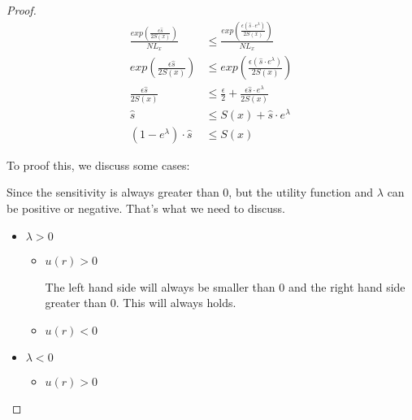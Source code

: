 \begin{proof}

\begin{equation*}
\begin{split}
\frac{exp(\frac{\epsilon \hat{s}}{2 S(x)})}{NL_x}
& \leq \frac{exp(\frac{\epsilon (\hat{s} \cdot e^{\lambda})}{2 S(x)})}{NL_x}\\
exp(\frac{\epsilon \hat{s}}{2 S(x)})
& \leq exp(\frac{\epsilon (\hat{s} \cdot e^{\lambda})}{2 S(x)}) \\
\frac{\epsilon \hat{s}}{2 S(x)}
& \leq \frac{\epsilon}{2} + \frac{\epsilon \hat{s} \cdot  e^{\lambda}}{2 S(x)}\\
\hat{s} & \leq S(x) + \hat{s} \cdot e^{\lambda}\\
(1 - e^{\lambda}) \cdot \hat{s} & \leq S(x)
\end{split}
\end{equation*}

To proof this, we discuss some cases:

Since the sensitivity is always greater than 0, but the utility function and $\lambda$ can be positive or negative. That's what we need to discuss.

\begin{itemize}
	\item $\lambda > 0$
	\begin{itemize}
		\item $u(r) > 0$

		The left hand side will always be smaller than 0 and the right hand side greater than 0. This will always holds.

		\item $u(r) < 0$


	\end{itemize}
	\item $\lambda < 0$
	\begin{itemize}
		\item $u(r) > 0$



\end{itemize}
\end{itemize}
\end{proof}
